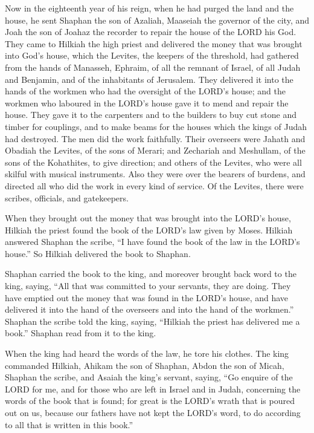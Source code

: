  Now in the eighteenth year of his reign, when he had purged
the land and the house, he sent Shaphan the son of Azaliah, Maaseiah the
governor of the city, and Joah the son of Joahaz the recorder to repair
the house of the LORD his God.  They came to Hilkiah the
high priest and delivered the money that was brought into God's house,
which the Levites, the keepers of the threshold, had gathered from the
hands of Manasseh, Ephraim, of all the remnant of Israel, of all Judah
and Benjamin, and of the inhabitants of Jerusalem.  They
delivered it into the hands of the workmen who had the oversight of the
LORD's house; and the workmen who laboured in the LORD's house gave it
to mend and repair the house.  They gave it to the
carpenters and to the builders to buy cut stone and timber for
couplings, and to make beams for the houses which the kings of Judah had
destroyed.  The men did the work faithfully. Their
overseers were Jahath and Obadiah the Levites, of the sons of Merari;
and Zechariah and Meshullam, of the sons of the Kohathites, to give
direction; and others of the Levites, who were all skilful with musical
instruments.  Also they were over the bearers of burdens,
and directed all who did the work in every kind of service. Of the
Levites, there were scribes, officials, and gatekeepers.

 When they brought out the money that was brought into the
LORD's house, Hilkiah the priest found the book of the LORD's law given
by Moses.  Hilkiah answered Shaphan the scribe, ``I have
found the book of the law in the LORD's house.'' So Hilkiah delivered
the book to Shaphan.

 Shaphan carried the book to the king, and moreover brought
back word to the king, saying, ``All that was committed to your
servants, they are doing.  They have emptied out the money
that was found in the LORD's house, and have delivered it into the hand
of the overseers and into the hand of the workmen.'' 
Shaphan the scribe told the king, saying, ``Hilkiah the priest has
delivered me a book.'' Shaphan read from it to the king.

 When the king had heard the words of the law, he tore his
clothes.  The king commanded Hilkiah, Ahikam the son of
Shaphan, Abdon the son of Micah, Shaphan the scribe, and Asaiah the
king's servant, saying,  ``Go enquire of the LORD for me,
and for those who are left in Israel and in Judah, concerning the words
of the book that is found; for great is the LORD's wrath that is poured
out on us, because our fathers have not kept the LORD's word, to do
according to all that is written in this book.''

